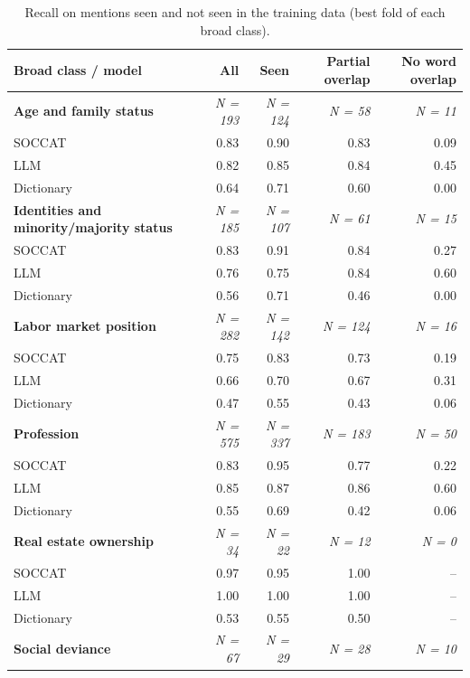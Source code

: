 \begin{table}[htb]
\centering
\scriptsize
\begin{threeparttable}
\caption{Recall on mentions seen and not seen in the training data (best fold of each broad class).}
\label{tab:unseen_recall}
\begin{tabular}{l r r r r}
\toprule
Broad class / model & All & Seen & Partial overlap & No word overlap \\
\midrule
\addlinespace
\textbf{Age and family status} & \textit{N = 193} & \textit{N = 124} & \textit{N = 58} & \textit{N = 11} \\
\quad SOCCAT & 0.83 & 0.90 & 0.83 & 0.09 \\
\quad LLM & 0.82 & 0.85 & 0.84 & 0.45 \\
\quad Dictionary & 0.64 & 0.71 & 0.60 & 0.00 \\
\addlinespace
\textbf{Identities and minority/majority status} & \textit{N = 185} & \textit{N = 107} & \textit{N = 61} & \textit{N = 15} \\
\quad SOCCAT & 0.83 & 0.91 & 0.84 & 0.27 \\
\quad LLM & 0.76 & 0.75 & 0.84 & 0.60 \\
\quad Dictionary & 0.56 & 0.71 & 0.46 & 0.00 \\
\addlinespace
\textbf{Labor market position} & \textit{N = 282} & \textit{N = 142} & \textit{N = 124} & \textit{N = 16} \\
\quad SOCCAT & 0.75 & 0.83 & 0.73 & 0.19 \\
\quad LLM & 0.66 & 0.70 & 0.67 & 0.31 \\
\quad Dictionary & 0.47 & 0.55 & 0.43 & 0.06 \\
\addlinespace
\textbf{Profession} & \textit{N = 575} & \textit{N = 337} & \textit{N = 183} & \textit{N = 50} \\
\quad SOCCAT & 0.83 & 0.95 & 0.77 & 0.22 \\
\quad LLM & 0.85 & 0.87 & 0.86 & 0.60 \\
\quad Dictionary & 0.55 & 0.69 & 0.42 & 0.06 \\
\addlinespace
\textbf{Real estate ownership} & \textit{N = 34} & \textit{N = 22} & \textit{N = 12} & \textit{N = 0} \\
\quad SOCCAT & 0.97 & 0.95 & 1.00 & -- \\
\quad LLM & 1.00 & 1.00 & 1.00 & -- \\
\quad Dictionary & 0.53 & 0.55 & 0.50 & -- \\
\addlinespace
\textbf{Social deviance} & \textit{N = 67} & \textit{N = 29} & \textit{N = 28} & \textit{N = 10} \\

\end{tabular}
\end{threeparttable}
\end{table}
